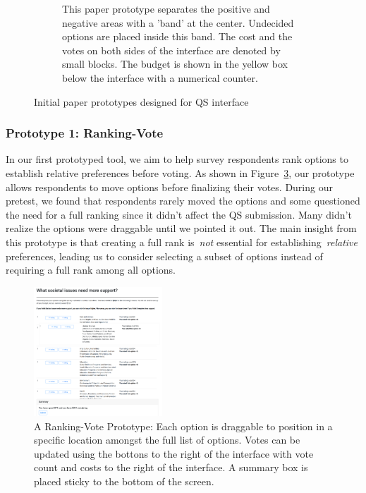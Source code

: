 \begin{figure}[H]
\begin{subfigure}[b]{0.42\textwidth}
        \caption{This paper prototype separates the positive and negative areas with a 'band' at the center. Undecided options are placed inside this band. The cost and the votes on both sides of the interface are denoted by small blocks. The budget is shown in the yellow box below the interface with a numerical counter.}
        \label{fig:vertical_paper}
    \end{subfigure}
    \caption{Initial paper prototypes designed for QS interface}
    \label{fig:qv_paper}
\end{figure}

\subsubsection{Prototype 1: Ranking-Vote}
In our first prototyped tool, we aim to help survey respondents rank options to establish relative preferences before voting. As shown in Figure~\ref{fig:qv_rank}, our prototype allows respondents to move options before finalizing their votes. During our pretest, we found that respondents rarely moved the options and some questioned the need for a full ranking since it didn't affect the QS submission. Many didn't realize the options were draggable until we pointed it out. The main insight from this prototype is that creating a full rank is~\textit{not} essential for establishing~\textit{relative} preferences, leading us to consider selecting a subset of options instead of requiring a full rank among all options.

\begin{figure}[h]
    \centering
    \includegraphics[width=0.43\textwidth]{content/image/prototypes/2_ranking.png}
    \caption{A Ranking-Vote Prototype: Each option is draggable to position in a specific location amongst the full list of options. Votes can be updated using the bottons to the right of the interface with vote count and costs to the right of the interface. A summary box is placed sticky to the bottom of the screen.}
    \label{fig:qv_rank}
\end{figure}

